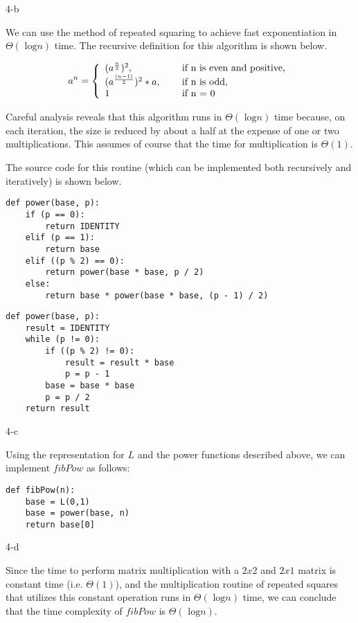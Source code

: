 \documentclass[11pt]{article}
\newcommand{\tlog}{\text{ log}}
\begin{document}
\begin{prob}{4-b}
\end{prob}
\begin{sol}

We can use the method of repeated squaring to achieve fast exponentiation in $\Theta(\tlog n)$ time. The recursive definition for this algorithm is shown below.

\[
a^{n} = \left\{ 
  \begin{array}{l l}
    (a^{\frac{n}{2}})^{2}, & \quad \text{ if n is even and positive,} \\
    (a^{\frac{(n-1)}{2}})^{2} * a, & \quad \text{ if n is odd}, \\
   1 & \quad \text{ if n = 0}
  \end{array} \right.
\]

Careful analysis reveals that this algorithm runs in $\Theta(\tlog n)$ time because, on each iteration, the size is reduced by about a half at the expense of one or two multiplications. This assumes of course that the time for multiplication is $\Theta(1)$.

The source code for this routine (which can be implemented both recursively and iteratively) is shown below.
\begin{lstlisting}
def power(base, p):
	if (p == 0):
		return IDENTITY
	elif (p == 1):
		return base
	elif ((p % 2) == 0):
		return power(base * base, p / 2)
	else:
		return base * power(base * base, (p - 1) / 2)
\end{lstlisting}

\begin{lstlisting}
def power(base, p):
	result = IDENTITY
	while (p != 0):
		if ((p % 2) != 0):
			result = result * base
			p = p - 1
		base = base * base
		p = p / 2
	return result
\end{lstlisting}
\end{sol}

\begin{prob}{4-c}
\end{prob}
\begin{sol}

Using the representation for $L$ and the power functions described above, we can implement $fibPow$ as follows:
\begin{lstlisting}
def fibPow(n):
	base = L(0,1)
	base = power(base, n)
	return base[0]
\end{lstlisting}
\end{sol}

\begin{prob}{4-d}
\end{prob}
\begin{sol}

Since the time to perform matrix multiplication with a $2x2$ and $2x1$ matrix is constant time (i.e. $\Theta(1)$), and the multiplication routine of repeated squares that utilizes this constant operation runs in $\Theta(\tlog n)$ time, we can conclude that the time complexity of $fibPow$ is $\Theta(\tlog n)$.
\end{sol}
\end{document}
